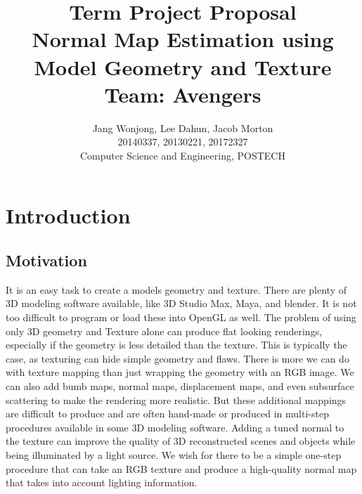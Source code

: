 \documentclass[10pt,twocolumn,letterpaper]{article}
\begin{document}
	
\title{Term Project Proposal \\
Normal Map Estimation using Model Geometry and Texture \\
Team: Avengers }
\author{Jang Wonjong, Lee Dahun, Jacob Morton\\
	20140337, 20130221, 20172327\\
	Computer Science and Engineering, POSTECH\\
	{\tt\small}}

\maketitle

\section{Introduction}
\subsection{Motivation}
It is an easy task to create a models geometry and texture. There are plenty of 3D modeling software available, like 3D Studio Max, Maya, and blender. It is not too difficult to program or load these into OpenGL as well. The problem of using only 3D geometry and Texture alone can produce flat looking renderings, especially if the geometry is less detailed than the texture. This is typically the case, as texturing can hide simple geometry and flaws. There is more we can do with texture mapping than just wrapping the geometry with an RGB image. We can also add bumb maps, normal maps, displacement maps, and even subsurface scattering to make the rendering more realistic. But these additional mappings are difficult to produce and are often hand-made or produced in multi-step procedures available in some 3D modeling software. Adding a tuned normal to the texture can improve the quality of 3D reconstructed scenes and objects while being illuminated by a light source. We wish for there to be a simple one-step procedure that can take an RGB texture and produce a high-quality normal map that takes into account lighting information.
\end{document}
